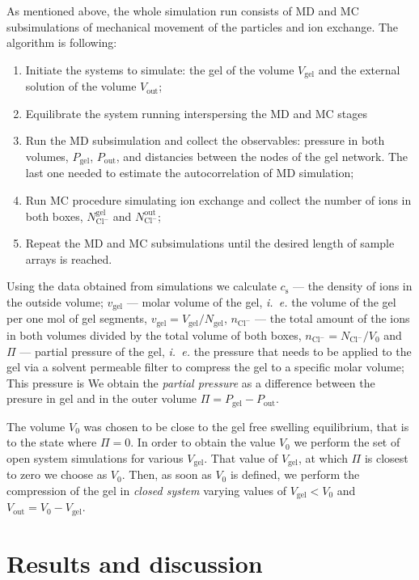 \documentclass[journal,article,submit,pdftex,moreauthors]{Definitions/mdpi}
\newcommand{\ie}{\textit{i.~e.} }
\newcommand{\ncl}{n_\mathrm{Cl^-}}
\newcommand{\Ncl}{N_\mathrm{Cl^-}}
\newcommand{\gel}{^\mathrm{gel}}
\newcommand{\out}{^{\mathrm{out}}}
\newcommand{\cs}{c_{\mathrm{s}}}
\newcommand{\Vgel}{V_\mathrm{gel}}
\newcommand{\vgel}{v_\mathrm{gel}}
\newcommand{\Ngel}{N_\mathrm{gel}}
\newcommand{\Pgel}{\Pi}
\newcommand{\Pout}{P_\mathrm{out}}
\newcommand{\Vout}{V_\mathrm{out}}
\newcommand{\Vbox}{V_0}
\begin{document}
As mentioned above, the whole simulation run consists of MD and MC subsimulations of mechanical movement of the particles and ion exchange. The algorithm is following:
\begin{enumerate}
\item Initiate the systems to simulate: the gel of the volume $\Vgel$ and the external solution of the volume $\Vout$;
\item Equilibrate the system running interspersing the MD and MC stages
\item Run the MD subsimulation and collect the observables: pressure in both volumes, $P_\mathrm{gel}$, $P_\mathrm{out}$, and distancies between the nodes of the gel network. The last one needed to estimate the autocorrelation of MD simulation;
\item Run MC procedure simulating ion exchange and collect the number of ions in both boxes, 
$\Ncl\gel$ and $\Ncl\out$; 
\item Repeat the MD and MC subsimulations until the desired length of sample arrays is reached.
\end{enumerate}


Using the data obtained from simulations we calculate  
$\cs$ --- the density of ions in  the outside volume;
$\vgel$ --- molar volume of the gel, \ie the volume of the gel per one mol of gel segments, $\vgel = \Vgel / \Ngel$,
$\ncl$ --- the total amount of the ions in both volumes divided by the total volume of both boxes, $\ncl = \Ncl/\Vbox$ and
$\Pgel$ --- partial pressure of the gel, \ie the pressure that needs to be applied to the gel via a solvent permeable filter to compress the gel to a specific molar volume; This pressure is 
We obtain the \emph{partial pressure} as a difference between the presure in gel and in the outer volume $\Pgel=P_\mathrm{gel} - \Pout$.



The volume $\Vbox$ was chosen to be close to the gel free swelling equilibrium, that is to the state where $\Pgel = 0$.
In order to obtain the value $\Vbox$ we perform the set of open system simulations for various $\Vgel$.
That value of $\Vgel$, at which $\Pgel$ is closest to zero we choose as $\Vbox$.
Then, as soon as $\Vbox$ is defined, we perform the compression of the gel in \emph{closed system} varying values of $\Vgel<\Vbox$ and $\Vout= \Vbox - \Vgel$.

\section{Results and discussion}
\end{document}
